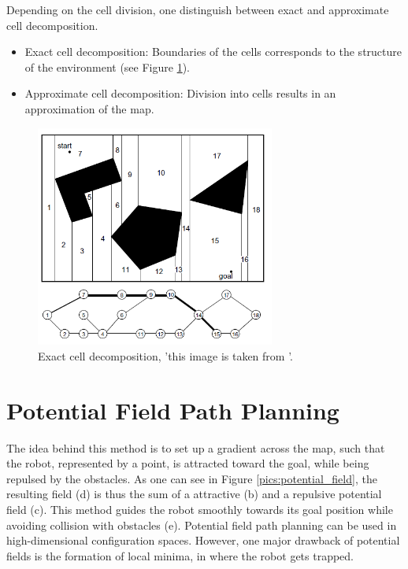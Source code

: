 Depending on the cell division, one distinguish between exact and approximate cell decomposition.

\begin{itemize}
	\item
	Exact cell decomposition: Boundaries of the cells corresponds to the structure of the environment (see Figure \ref{pics:cell_decomposition}).
	\item
	Approximate cell decomposition: Division into cells results in an approximation of the map. 
\end{itemize}

\begin{figure} [h]
	\centering
	\includegraphics[width=0.7\textwidth]{images/cell_decomposition.png}
	\caption{Exact cell decomposition, 'this image is taken from \cite{Siegwart2004}'.}
	\label{pics:cell_decomposition}
\end{figure}

\section{Potential Field Path Planning}

The idea behind this method is to set up a gradient across the map, such that the robot, represented by a point, is attracted toward the goal, while being repulsed by the obstacles. As one can see in Figure \ref{pics:potential_field}, the resulting field (d) is thus the sum of a attractive (b) and a repulsive potential field (c). This method guides the robot smoothly towards its goal position while avoiding collision with obstacles (e). Potential field path planning can be used in high-dimensional configuration spaces. However, one major drawback of potential fields is the formation of local minima, in where the robot gets trapped. 

